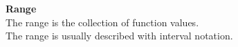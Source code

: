 \documentclass{ximera}
\begin{document}
\begin{explanation}  \textbf{\textcolor{blue!75!black}{Range}} \\

The range is the collection of function values. \\

The range is usually described with interval notation.

\end{explanation}
\end{document}
